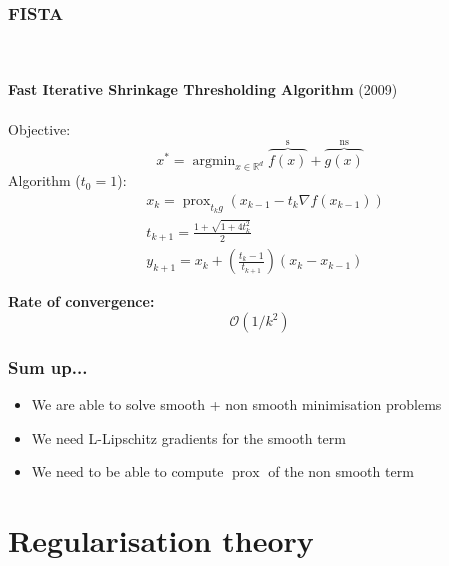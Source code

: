 \documentclass[aspectratio=169]{beamer}
\DeclareMathOperator{\Prox}{prox}
\newcommand{\prox}[2]{\Prox_{#1}\left({#2}\right)}
\newcommand{\RR}{\mathbb{R}}
\newcommand{\rd}{\mathbb{R}^d}
\newcommand{\normtwosq}[1]{\left\|#1\right\|_2^2}
\newcommand{\onehalf}{\frac{1}{2}}
\DeclareMathOperator*{\argmin}{argmin}
\begin{document}
		\begin{frame}
		\frametitle{FISTA}
		\quad \\ \quad \\
		\textbf{Fast Iterative Shrinkage Thresholding Algorithm} (2009)
		\quad \\ \quad \\
		Objective:
		\begin{equation}
		\nonumber
		x^* = \argmin_{x\in\rd} \overbrace{f(x)}^{\text{s}} + \overbrace{g(x)}^{\text{ns}}%
		\end{equation}
		Algorithm ($t_0 = 1$):
		\begin{align}
		\nonumber &x_k = \prox{t_k g}{x_{k-1} - t_k\nabla f(x_{k-1})}\\
		\nonumber &t_{k+1} = \frac{1+\sqrt{1+4t_k^2}}{2}\\
		\nonumber &y_{k+1} = x_k + \left(\frac{t_k-1}{t_{k+1}}\right)\left(x_k - x_{k-1}\right)
		\end{align}
		
		\textbf{Rate of convergence: }
		\begin{equation}
		\nonumber
		\mathcal{O}\left(1/k^2\right)
		\end{equation}
		
		
		\end{frame}
		
		\begin{frame}
		\frametitle{Sum up...}
		
		\begin{itemize}
		\item We are able to solve smooth + non smooth minimisation problems
		\item We need L-Lipschitz gradients for the smooth term
		\item We need to be able to compute $\Prox$ of the non smooth term
		\end{itemize}
		\end{frame}
		
		\section{Regularisation theory}
		
\end{document}
